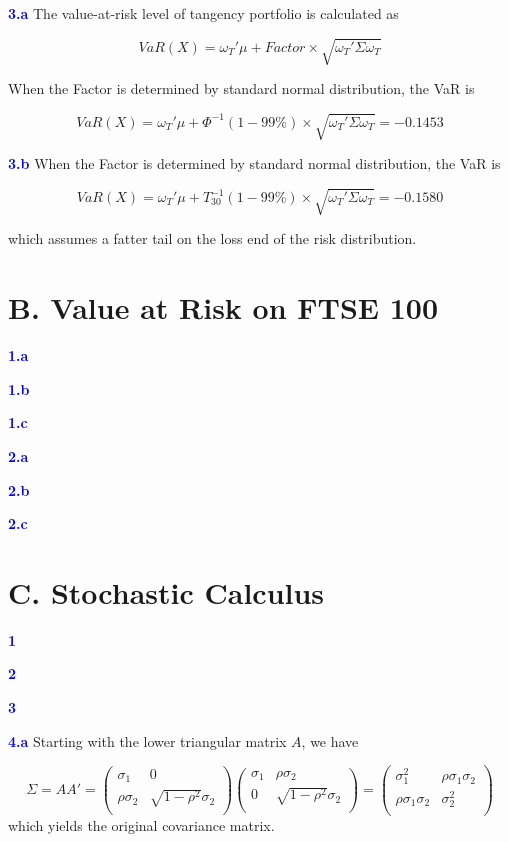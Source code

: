 \documentclass[a4paper,11pt] {article}
\begin{document}
\textcolor{blue}{\bf 3.a } The value-at-risk level of tangency portfolio is calculated as

$$
VaR(X) = \omega_T' \mu + Factor \times \sqrt{\omega_T'\Sigma\omega_T}
$$

When the Factor is determined by standard normal distribution, the VaR is

$$
VaR(X) = \omega_T' \mu + \Phi^{-1}(1-99\%) \times \sqrt{\omega_T'\Sigma\omega_T} = -0.1453
$$


\textcolor{blue}{\bf 3.b } When the Factor is determined by standard normal distribution, the VaR is

$$
VaR(X) = \omega_T' \mu + T_30^{-1}(1-99\%) \times \sqrt{\omega_T'\Sigma\omega_T} = -0.1580
$$

which assumes a fatter tail on the loss end of the risk distribution.

\section*{B. Value at Risk on FTSE 100}
\textcolor{blue}{\bf 1.a }

\textcolor{blue}{\bf 1.b }

\textcolor{blue}{\bf 1.c }

\textcolor{blue}{\bf 2.a }

\textcolor{blue}{\bf 2.b }

\textcolor{blue}{\bf 2.c }

\section*{C. Stochastic Calculus}
\textcolor{blue}{\bf 1 }

\textcolor{blue}{\bf 2}

\textcolor{blue}{\bf 3 }

\textcolor{blue}{\bf 4.a } Starting with the lower triangular matrix $A$, we have

$$
\Sigma = AA' =
\left(
  \begin{array}{cc}
    \sigma_1 & 0 \\
    \rho \sigma_2 & \sqrt{1-\rho^2}\sigma_2 \\
  \end{array}
\right)
\left(
  \begin{array}{cc}
    \sigma_1 & \rho \sigma_2 \\
    0 & \sqrt{1-\rho^2}\sigma_2 \\
  \end{array}
\right)
=
\left(
  \begin{array}{cc}
    \sigma_1^2 & \rho \sigma_1 \sigma_2 \\
    \rho \sigma_1 \sigma_2 & \sigma_2^2 \\
  \end{array}
\right)
$$
which yields the original covariance matrix.
\end{document}
